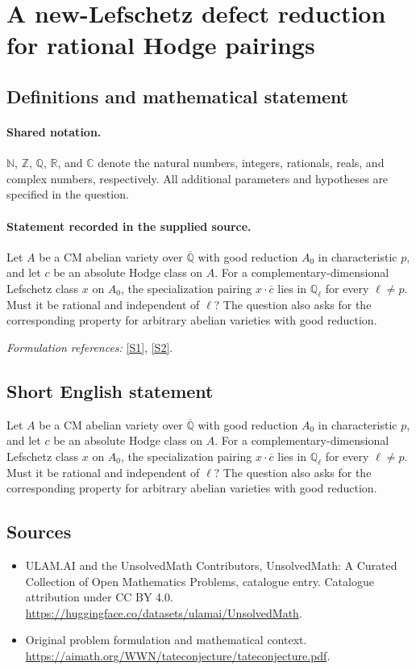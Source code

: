 \documentclass[11pt]{article}
\newcommand{\sref}[2]{\hyperlink{source:#1:#2}{[S#2]}}
\begin{document}
\section{A new-Lefschetz defect reduction for rational Hodge pairings}\label{statement}

\subsection{Definitions and mathematical statement}

\paragraph{Shared notation.}$\mathbb N$, $\mathbb Z$, $\mathbb Q$, $\mathbb R$, and $\mathbb C$ denote the natural numbers, integers, rationals, reals, and complex numbers, respectively. All additional parameters and hypotheses are specified in the question.


\paragraph{Statement recorded in the supplied source.}
Let $A$ be a CM abelian variety over $\overline{\mathbb Q}$ with good reduction $A_0$ in characteristic $p$, and let $c$ be an absolute Hodge class on $A$. For a complementary-dimensional Lefschetz class $x$ on $A_0$, the specialization pairing $x\cdot\overline c$ lies in $\mathbb Q_\ell$ for every $\ell\neq p$. Must it be rational and independent of $\ell$? The question also asks for the corresponding property for arbitrary abelian varieties with good reduction.
\par\smallskip\textit{Formulation references:} \sref{statement}{1}, \sref{statement}{2}.
\subsection{Short English statement}
Let $A$ be a CM abelian variety over $\overline{\mathbb Q}$ with good reduction $A_0$ in characteristic $p$, and let $c$ be an absolute Hodge class on $A$. For a complementary-dimensional Lefschetz class $x$ on $A_0$, the specialization pairing $x\cdot\overline c$ lies in $\mathbb Q_\ell$ for every $\ell\neq p$. Must it be rational and independent of $\ell$? The question also asks for the corresponding property for arbitrary abelian varieties with good reduction.
\subsection{Sources}
\begin{itemize}
\item[\hypertarget{source:statement:1}{S1}] ULAM.AI and the UnsolvedMath Contributors, UnsolvedMath: A Curated Collection of Open Mathematics Problems, catalogue entry. Catalogue attribution under CC BY 4.0.
\url{https://huggingface.co/datasets/ulamai/UnsolvedMath}.
\item[\hypertarget{source:statement:2}{S2}] Original problem formulation and mathematical context.
\url{https://aimath.org/WWN/tateconjecture/tateconjecture.pdf}.
\end{itemize}
\label{end:statement}
\end{document}

